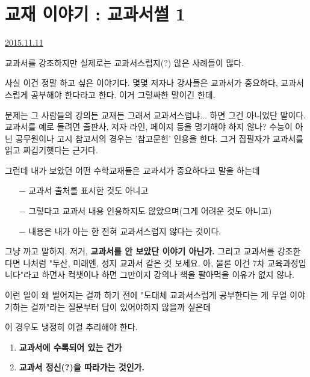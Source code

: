 \section{교재 이야기 : 교과서썰 1}
\href{https://www.kockoc.com/Apoc/476332}{2015.11.11}

\vspace{5mm}

교과서를 강조하지만 실제로는 교과서스럽지(?) 않은 사례들이 많다.
\vspace{5mm}

사실 이건 정말 하고 싶은 이야기다.
몇몇 저자나 강사들은 교과서가 중요하다, 교과서스럽게 공부해야 한다라고 한다.
이거 그럴싸한 말이긴 한데.
\vspace{5mm}

문제는 그 사람들의 강의든 교재든 그래서 교과서스럽냐... 하면 그건 아니었단 말이다.
교과서를 예로 들려면 출판사, 저자 라인, 페이지 등을 명기해야 하지 않나?
수능이 아닌 공무원이나 고시 참고서의 경우는 '참고문헌' 인용을 한다. 그거 집필자가 교과서를 읽고 짜깁기햇다는 근거다.
\vspace{5mm}

그런데 내가 보았던 어떤 수학교재들은 교과서가 중요하다고 말을 하는데
\begin{itemize}
    \item[$-$] 교과서 출처를 표시한 것도 아니고
    \item[$-$] 그렇다고 교과서 내용 인용하지도 않았으며(그게 어려운 것도 아니고)
    \item[$-$] 내용은 내가 아는 한 전혀 교과서스럽지 않다는 것이다.
\end{itemize}
\vspace{5mm}

그냥 까고 말하지. 저거, \textbf{교과서를 안 보았단 이야기 아닌가.}
그리고 교과서를 강조한다면 나처럼 "두산, 미래엔, 성지 교과서 같은 것 보세요. 아, 물론 이건 7차 교육과정입니다"라고 하면사 컥챗이나 하면 그만이지
강의나 책을 팔아먹을 이유가 없지 않나.
\vspace{5mm}

이런 일이 왜 벌어지는 걸까  하기 전에
"도대체 교과서스럽게 공부한다는 게 무얼 이야기하는 걸까"라는 질문부터 답이 있어야하지 않을까 싶은데
\vspace{5mm}

이 경우도 냉정히 이걸 추리해야 한다.
\vspace{5mm}
\begin{enumerate}
    \item \textbf{ 교과서에 수록되어 있는 건가}
    \item \textbf{ 교과서 정신(?)을 따라가는 것인가.}
\end{enumerate}
\vspace{5mm}

